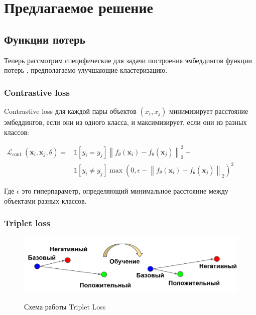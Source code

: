 \section{Предлагаемое решение}
\label{sec:Chapter3} 


\subsection{Функции потерь}
\label{sec:LossFunctions}
    Теперь рассмотрим специфические для задачи построения эмбеддингов функции потерь \cite{weng2021contrastive}, предполагаемо улучшающие кластеризацию.

\subsubsection{Contrastive loss}

Contrastive loss \cite{LossContrstive} для каждой пары объектов $\left(x_i, x_j\right)$ минимизирует расстояние эмбеддингов, если они из одного класса, и максимизирует, если они из разных классов:


$\begin{aligned} \mathcal{L}_{\text {cont }}\left(\mathbf{x}_i, \mathbf{x}_j, \theta\right) = & \mathbb{1}\left[y_i=y_j\right]\left\|f_\theta\left(\mathbf{x}_i\right)-f_\theta\left(\mathbf{x}_j\right)\right\|_2^2+ \\ & \mathbb{1}\left[y_i \neq y_j\right] \max \left(0, \epsilon-\left\|f_\theta\left(\mathbf{x}_i\right)-f_\theta\left(\mathbf{x}_j\right)\right\|_2\right)^2\end{aligned}$


Где $\epsilon$ это гиперпараметр, определяющий минимальное расстояние между объектами разных классов.

\subsubsection{Triplet loss}
\begin{figure}[h!]
\caption{Схема работы Triplet Loss}
\centering
\includegraphics[width=16cm]{Images/triplet_loss_rus_noback.png}
\label{fig:triplet_loss_rus_noback}
\end{figure}

